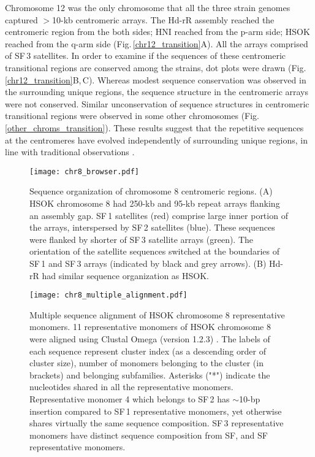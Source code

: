   Chromosome 12 was the only chromosome that all the three strain genomes captured $>$10-kb centromeric arrays. The Hd-rR assembly reached the centromeric region from the both sides; HNI reached from the p-arm side; HSOK reached from the q-arm side (Fig.\,\ref{chr12_transition}A). All the arrays comprised of SF\,3 satellites. In order to examine if the sequences of these centromeric transitional regions are conserved among the strains, dot plots were drawn (Fig.\,\ref{chr12_transition}B,\,C). Whereas modest sequence conservation was observed in the surrounding unique regions, the sequence structure in the centromeric arrays were not conserved. Similar unconservation of sequence structures in centromeric transitional regions were observed in some other chromosomes (Fig.\,\ref{other_chroms_transition}). These results suggest that the repetitive sequences at the centromeres have evolved independently of surrounding unique regions, in line with traditional observations \cite{Willard1991}.



  \begin{figure*}
    \centering
    \texttt{[image: chr8\_browser.pdf]}
    \caption{
      Sequence organization of chromosome 8 centromeric regions. (A) HSOK chromosome 8 had 250-kb and 95-kb repeat arrays flanking an assembly gap. SF\,1 satellites (red) comprise large inner portion of the arrays, interspersed by SF\,2 satellites (blue). These sequences were flanked by shorter of SF\,3 satellite arrays (green). The orientation of the satellite sequences switched at the boundaries of SF\,1 and SF\,3 arrays (indicated by black and grey arrows). (B) Hd-rR had similar sequence organization as HSOK.
    }
    \label{chr8_browser}
  \end{figure*}

  \begin{figure*}
    \centering
    \texttt{[image: chr8\_multiple\_alignment.pdf]}
    \caption{
      Multiple sequence alignment of HSOK chromosome 8 representative monomers. 11 representative monomers of HSOK chromosome 8 were aligned using Clustal Omega (version 1.2.3) \cite{Sievers2011}. The labels of each sequence represent cluster index (as a descending order of cluster size), number of monomers belonging to the cluster (in brackets) and belonging subfamilies. Asterisks ("*") indicate the nucleotides shared in all the representative monomers. Representative monomer 4 which belongs to SF\,2 has $\sim$10-bp insertion compared to SF\,1 representative monomers, yet otherwise shares virtually the same sequence composition. SF\,3 representative monomers have distinct sequence composition from SF\1, and SF\2 representative monomers.
    }
    \label{chr8_multiple_alignment}
  \end{figure*}

